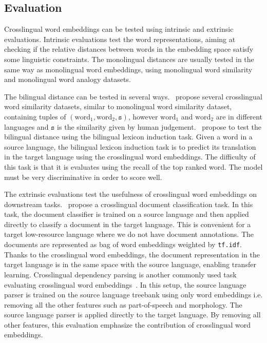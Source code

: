 \documentclass[12pt,twoside,final,hidelinks]{ltthesis}
\theoremstyle{definition}
\begin{document}
\subsection{Evaluation}
Crosslingual word embeddings can be tested using intrinsic and extrinsic evaluations. Intrinsic evaluations test the word representations, aiming at checking if the relative distances between words in the embedding space satisfy some linguistic constraints. 
The monolingual distances are usually tested in the same way as monolingual word embeddings, using
monolingual word similarity and monolingual word analogy datasets. 

The bilingual distance can be tested in several ways.~ propose 
several crosslingual word similarity datasets, similar to monolingual word similarity dataset, containing tuples 
of $(\text{word}_1,\text{word}_2,\texttt{s})$, however $\text{word}_1$ and $\text{word}_2$ are in different languages and $\texttt{s}$ is the similarity given by human judgement.~ propose to test the bilingual distance using the bilingual lexicon induction task. 
Given a word in a source language, the bilingual lexicon induction task is to predict its translation in the target language 
using the crosslingual word embeddings. The difficulty of this task is that it is evaluates using the recall of the top ranked word. 
The model must be very discriminative in order to score well.

The extrinsic evaluations test the usefulness of crosslingual word embeddings on downstream tasks.~ propose a
crosslingual document classification task. In this task, the document classifier is trained on a source language and then applied directly 
to classify a document in the target language. This is convenient for a target low-resource language where we do not have document annotations. 
The documents are represented as bag of word embeddings weighted by \texttt{tf.idf}. Thanks to  the crosslingual word embeddings, the document 
representation in the target language is in the same space with the source language, enabling transfer learning. Crosslingual dependency 
parsing is another commonly used task evaluating crosslingual word embeddings~\cite{DBLP:AmmarMTLDS16,upadhyay-EtAl:2016:P16-1}. In this setup, 
the source language parser is trained on the source language treebank using only word embeddings i.e. removing all the other features 
such as part-of-speech and morphology. The source language parser is applied directly to the target language. By removing all other features, 
this evaluation emphasize the contribution of crosslingual word embeddings. 
\end{document}
